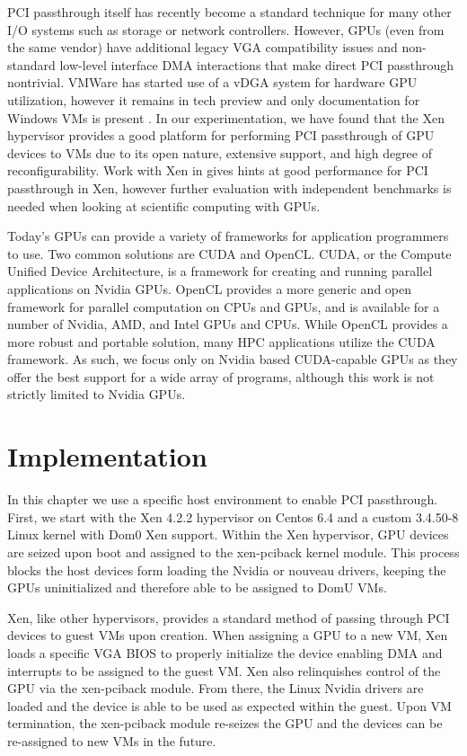 PCI passthrough itself has recently become a standard technique for many other I/O systems such as storage or network controllers.  However, GPUs (even from the same vendor) have additional legacy VGA compatibility issues and non-standard low-level interface DMA interactions that make direct PCI passthrough nontrivial. VMWare has started use of a vDGA system for hardware GPU utilization, however it remains in tech preview and only documentation for Windows VMs is present \cite{vmwaregpu}.  In our experimentation, we have found that the Xen hypervisor provides a good platform for performing PCI passthrough of GPU devices to VMs due to its open nature, extensive support, and high degree of reconfigurability. Work with Xen in \cite{yang2012using} gives hints at good performance for PCI passthrough in Xen, however further evaluation with independent benchmarks is needed when looking at scientific computing with GPUs.

Today's GPUs can provide a variety of frameworks for application programmers to use. Two common solutions are CUDA and OpenCL. CUDA, or the Compute Unified Device Architecture, is a framework for creating and running parallel applications on Nvidia GPUs. OpenCL provides a more generic and open framework for parallel computation on CPUs and GPUs, and is available for a number of Nvidia, AMD, and Intel GPUs and CPUs. While OpenCL provides a more robust and portable solution, many HPC applications utilize the CUDA framework. As such, we focus only on Nvidia based CUDA-capable GPUs as they offer the best support for a wide array of programs, although this work is not strictly limited to Nvidia GPUs.

\section{Implementation}

In this chapter we use a specific host environment to enable PCI passthrough. First, we start with the Xen 4.2.2 hypervisor on Centos 6.4 and a custom 3.4.50-8 Linux kernel with Dom0 Xen support.  Within the Xen hypervisor, GPU devices are seized upon boot and assigned to the xen-pciback kernel module. This process blocks the host devices form loading the Nvidia or nouveau drivers, keeping the GPUs uninitialized and therefore able to be assigned to DomU VMs.  

Xen, like other hypervisors, provides a standard method of passing through PCI devices to guest VMs upon creation.  When assigning a GPU to a new VM, Xen loads a specific VGA BIOS to properly initialize the device enabling DMA and interrupts to be assigned to the guest VM. Xen also relinquishes control of the GPU via the xen-pciback module. From there, the Linux Nvidia drivers are loaded and the device is able to be used as expected within the guest. Upon VM termination, the xen-pciback module re-seizes the GPU and the devices can be re-assigned to new VMs in the future. 

